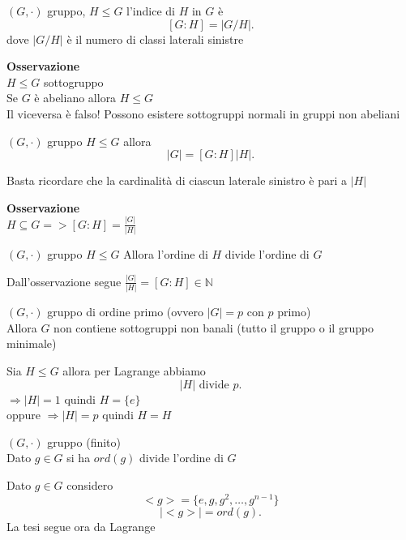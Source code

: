 \documentclass[12px]{article}
\begin{document}
{\begin{defi}
		 $(G,\cdot)$ gruppo, $H\leq G$ l'indice di  $H$ in $G$ è 
		  \[
			  [G:H] = |G/H|
		 .\] 
		 dove $|G/H|$ è il numero di classi laterali sinistre
	\end{defi}
	\textbf{Osservazione}\\
	$H\leq G$ sottogruppo\\
	Se  $G$ è abeliano allora  $H\leq G$\\
	Il viceversa è falso! Possono esistere sottogruppi normali in gruppi non abeliani\\
	\begin{prop}
		$(G,\cdot)$ gruppo $H\leq G$ allora
		 \[
			 |G| = [G:H]|H|
		.\] 
	\end{prop}
	\begin{dimo}
		Basta ricordare che la cardinalità di ciascun laterale sinistro è pari a $|H|$
	\end{dimo}
	\textbf{Osservazione}\\
	$\displaystyle H\subseteq G => [G:H] = \frac {|G|}{|H|}$\\
	\begin{teo}[Lagrange]
		$(G,\cdot)$ gruppo $H\leq G$ Allora l'ordine di  $H$ divide l'ordine di  $G$
	\end{teo}
	\begin{dimo}
		Dall'osservazione segue $\displaystyle\frac{|G|}{|H|} = [G:H]\in \mathbb N$
	\end{dimo}
	\begin{coro}
		$(G,\cdot)$ gruppo di ordine primo (ovvero $|G| = p$ con $p$ primo)\\
		Allora $G$ non contiene sottogruppi non banali (tutto il gruppo o il gruppo minimale)
	\end{coro}
	\begin{dimo}
		Sia $H\leq G$ allora per Lagrange abbiamo
		 \[
			 |H| \text{ divide } p
		.\] 
		$ \Rightarrow |H| = 1$ quindi  $H = \lbrace e \rbrace$\\
		oppure 
		$ \Rightarrow |H| = p$ quindi $H=H$

	\end{dimo}
	\begin{coro}
		$(G,\cdot)$ gruppo (finito)\\
		Dato $g\in G $ si ha  $ord(g)$ divide l'ordine di $G$
		
	\end{coro}
	\begin{dimo}
		Dato $g\in G$ considero\\
		\[
			<g> = \lbrace e, g, g^2, \ldots, g^{n-1}\rbrace
		\]
		\[
		|<g>| = ord(g)
		.\] 
		La tesi segue ora da Lagrange
	\end{dimo}
}
\end{document}
